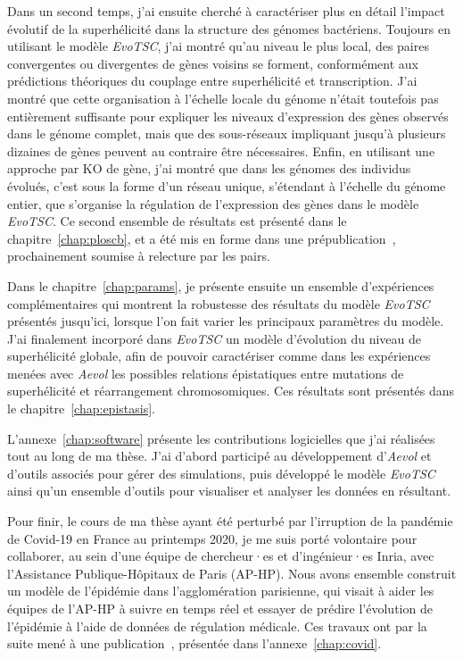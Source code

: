 Dans un second temps, j'ai ensuite cherché à caractériser plus en détail l'impact évolutif de la superhélicité dans la structure des génomes bactériens.
Toujours en utilisant le modèle \emph{EvoTSC}, j'ai montré qu'au niveau le plus local, des paires convergentes ou divergentes de gènes voisins se forment, conformément aux prédictions théoriques du couplage entre superhélicité et transcription.
J'ai montré que cette organisation à l'échelle locale du génome n'était toutefois pas entièrement suffisante pour expliquer les niveaux d'expression des gènes observés dans le génome complet, mais que des sous-réseaux impliquant jusqu'à plusieurs dizaines de gènes peuvent au contraire être nécessaires.
Enfin, en utilisant une approche par KO de gène, j'ai montré que dans les génomes des individus évolués, c'est sous la forme d'un réseau unique, s'étendant à l'échelle du génome entier, que s'organise la régulation de l'expression des gènes dans le modèle \emph{EvoTSC}.
Ce second ensemble de résultats est présenté dans le chapitre~\ref{chap:ploscb}, et a été mis en forme dans une prépublication~\citep{grohens2022b}, prochainement soumise à relecture par les pairs.

Dans le chapitre~\ref{chap:params}, je présente ensuite un ensemble d'expériences complémentaires qui montrent la robustesse des résultats du modèle \emph{EvoTSC} présentés jusqu'ici, lorsque l'on fait varier les principaux paramètres du modèle.
J'ai finalement incorporé dans \emph{EvoTSC} un modèle d'évolution du niveau de superhélicité globale, afin de pouvoir caractériser comme dans les expériences menées avec \emph{Aevol} les possibles relations épistatiques entre mutations de superhélicité et réarrangement chromosomiques.
Ces résultats sont présentés dans le chapitre~\ref{chap:epistasis}.

L'annexe~\ref{chap:software} présente les contributions logicielles que j'ai réalisées tout au long de ma thèse.
J'ai d'abord participé au développement d'\emph{Aevol} et d'outils associés pour gérer des simulations, puis développé le modèle \emph{EvoTSC} ainsi qu'un ensemble d'outils pour visualiser et analyser les données en résultant.

Pour finir, le cours de ma thèse ayant été perturbé par l'irruption de la pandémie de Covid-19 en France au printemps 2020, je me suis porté volontaire pour collaborer, au sein d'une équipe de chercheur·es et d'ingénieur·es Inria, avec l'Assistance Publique-Hôpitaux de Paris (AP-HP).
Nous avons ensemble construit un modèle de l'épidémie dans l'agglomération parisienne, qui visait à aider les équipes de l'AP-HP à suivre en temps réel et essayer de prédire l'évolution de l'épidémie à l'aide de données de régulation médicale.
Ces travaux ont par la suite mené à une publication~\citep{gaubert2020}, présentée dans l'annexe~\ref{chap:covid}.

